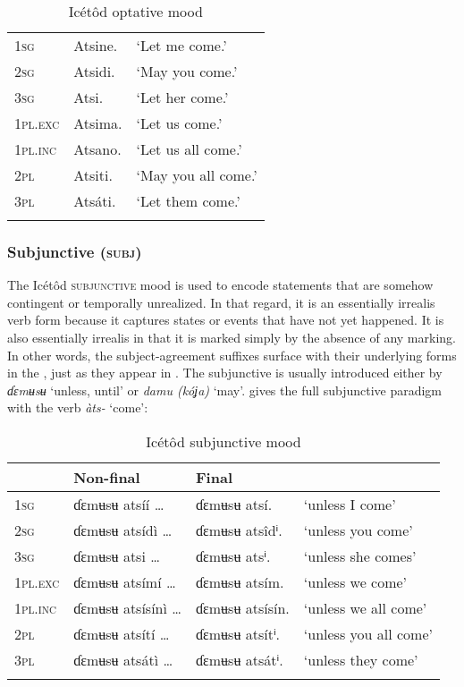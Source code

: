 \begin{table}
\caption{Icétôd optative mood}
\label{tab:verbs:opt}


\begin{tabularx}{.66\textwidth}{lXl}
\lsptoprule

\textsc{1sg} & Atsine. & ‘Let me come.’\\
\textsc{2sg} & Atsidi. & ‘May you come.’\\
\textsc{3sg} & Atsi. & ‘Let her come.’\\
\textsc{1pl.exc} & Atsima. & ‘Let us come.’\\
\textsc{1pl.inc} & Atsano. & ‘Let us all come.’\\
\textsc{2pl} & Atsiti. & ‘May you all come.’\\
\textsc{3pl} & Atsáti. & ‘Let them come.’\\
\lspbottomrule
\end{tabularx}
\end{table}

\subsubsection{Subjunctive (\textsc{subj})}\label{sec:8.10.4}

The Icétôd \textsc{subjunctive} mood is used to encode statements that are somehow contingent or temporally unrealized. In that regard, it is an essentially irrealis verb form because it captures states or events that have not yet happened. It is also essentially irrealis in that it is marked simply by the absence of any marking. In other words, the subject-agreement suffixes surface with their underlying forms in the , just as they appear in . The subjunctive is usually introduced either by \textit{ɗɛmʉsʉ} ‘unless, until’ or \textit{damu (kóʝa)} ‘may’.  gives the full subjunctive paradigm with the verb \textit{àts-} ‘come’:


\begin{table}
\caption{Icétôd subjunctive mood}
\label{tab:verbs:subjct}


\begin{tabularx}{\textwidth}{XlXl}
\lsptoprule

& Non-final & Final & \\
\midrule
\textsc{1sg} & ɗɛmʉsʉ atsíí {\dots} & ɗɛmʉsʉ atsí. & ‘unless I come’\\
\textsc{2sg} & ɗɛmʉsʉ atsídì {\dots} & ɗɛmʉsʉ atsîdⁱ. & ‘unless you come’\\
\textsc{3sg} & ɗɛmʉsʉ atsi {\dots} & ɗɛmʉsʉ atsⁱ. & ‘unless she comes’\\
\textsc{1pl.exc} & ɗɛmʉsʉ atsímí {\dots} & ɗɛmʉsʉ atsím. & ‘unless we come’\\
\textsc{1pl.inc} & ɗɛmʉsʉ atsísínì {\dots} & ɗɛmʉsʉ atsísín. & ‘unless we all come’\\
\textsc{2pl} & ɗɛmʉsʉ atsítí {\dots} & ɗɛmʉsʉ atsítⁱ. & ‘unless you all come’\\
\textsc{3pl} & ɗɛmʉsʉ atsátì {\dots} & ɗɛmʉsʉ atsátⁱ. & ‘unless they come’\\
\lspbottomrule
\end{tabularx}
\end{table}

